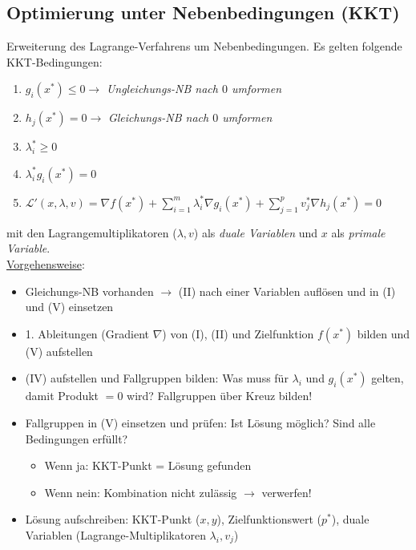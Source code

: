\subsection{Optimierung unter Nebenbedingungen (KKT)}

Erweiterung des Lagrange-Verfahrens um Nebenbedingungen.
Es gelten folgende KKT-Bedingungen:

\begin{enumerate}[label=(\Roman*)]
    \item \(g_i(x^*)\leq 0 \rightarrow \) \emph{Ungleichungs-NB nach \(0\) umformen}
    \item \(h_j(x^*)=0 \rightarrow\) \emph{Gleichungs-NB nach \(0\) umformen}
    \item \(\lambda_i^*\geq 0\)
    \item \(\lambda_i^*g_i(x^*)=0\)
    \item $\mathcal{L}'(x,\lambda, v) = \nabla f(x^*) + \sum_{i=1}^m \lambda_i^* \nabla g_i(x^*) + \sum_{j=1}^p v_j^* \nabla h_j(x^*) = 0$\\
\end{enumerate}

mit den Lagrangemultiplikatoren ($\lambda, v$) als \emph{duale Variablen} und $x$ als \emph{primale Variable}.\\

\underline{Vorgehensweise}:
\begin{itemize}
    \item Gleichungs-NB vorhanden \(\rightarrow\) (II) nach einer Variablen auflösen und in (I) und (V) einsetzen
    \item 1. Ableitungen (Gradient \(\nabla\)) von (I), (II) und Zielfunktion \(f(x^*)\) bilden und (V) aufstellen
    \item (IV) aufstellen und Fallgruppen bilden: Was muss für \(\lambda_i\) und \(g_i(x^*)\) gelten, damit Produkt \(=0\) wird? Fallgruppen über Kreuz bilden!
    \item Fallgruppen in (V) einsetzen und prüfen: Ist Lösung möglich? Sind alle Bedingungen erfüllt?
    \begin{itemize}
        \item Wenn ja: KKT-Punkt = Lösung gefunden
        \item Wenn nein: Kombination nicht zulässig \(\rightarrow\) verwerfen!
    \end{itemize}
    \item Lösung aufschreiben: KKT-Punkt (\(x, y\)), Zielfunktionswert (\(p^*\)), duale Variablen (Lagrange-Multiplikatoren \(\lambda_i, v_j\))\\
\end{itemize}

